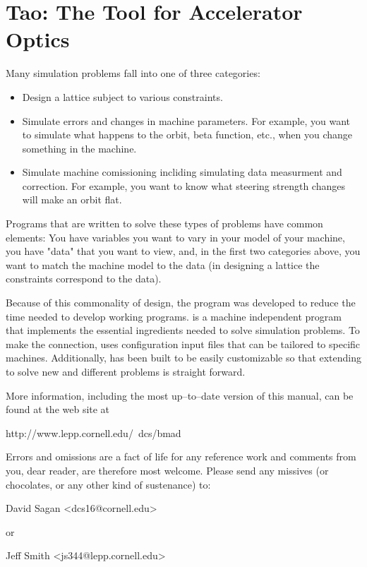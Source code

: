 \section*{Tao: The Tool for Accelerator Optics}

Many simulation problems fall into one of three categories: 

\begin{itemize}
\item 
Design a lattice subject to various constraints.
\item
Simulate errors and changes in machine parameters. For example, you want to
simulate what happens to the orbit, beta function, etc., when you change
something in the machine. 
\item 
Simulate machine comissioning incliding simulating data measurment and
correction. For example, you want to know what steering strength changes will
make an orbit flat.
\end{itemize}
 
Programs that are written to solve these types of problems have common elements:
You have variables you want to vary in your model of your machine, you have
"data" that you want to view, and, in the first two categories above, you want
to match the machine model to the data (in designing a lattice the constraints
correspond to the data).

Because of this commonality of design, the \tao program was developed to reduce
the time needed to develop working programs. \tao is a machine independent
program that implements the essential ingredients needed to solve simulation
problems. To make the connection, \tao uses configuration input files that can
be tailored to specific machines. Additionally, \tao has been built to be easily
customizable so that extending \tao to solve new and different problems is
straight forward.

More information, including the most up--to--date version of this
manual, can be found at the \bmad web site at
\begin{example}
  http://www.lepp.cornell.edu/~dcs/bmad
\end{example}

Errors and omissions are a fact of life for any reference work and
comments from you, dear reader, are therefore most welcome. Please
send any missives (or chocolates, or any other kind of sustenance) to:
\begin{example}
  David Sagan <dcs16@cornell.edu>
\end{example}
or
\begin{example}
  Jeff Smith <js344@lepp.cornell.edu>
\end{example}
